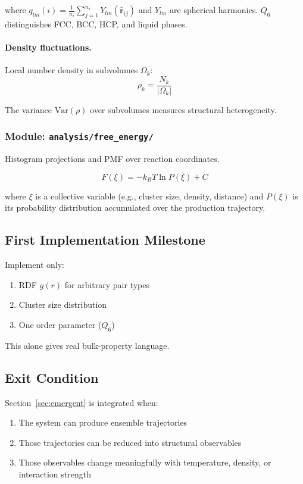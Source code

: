 \documentclass[11pt]{article}
\begin{document}
where $q_{lm}(i) = \frac{1}{n_i} \sum_{j=1}^{n_i} Y_{lm}(\hat{\mathbf{r}}_{ij})$
and $Y_{lm}$ are spherical harmonics.  $Q_6$ distinguishes FCC, BCC, HCP,
and liquid phases.

\paragraph{Density fluctuations.}
Local number density in subvolumes $\Omega_k$:
\begin{equation}
  \rho_k = \frac{N_k}{|\Omega_k|}
\end{equation}

The variance $\text{Var}(\rho)$ over subvolumes measures structural
heterogeneity.

\subsubsection{Module: \texttt{analysis/free\_energy/}}

Histogram projections and PMF over reaction coordinates.

\begin{equation}
  F(\xi) = -k_B T \ln P(\xi) + C
  \label{eq:free_energy_1d}
\end{equation}

where $\xi$ is a collective variable (e.g., cluster size, density, distance)
and $P(\xi)$ is its probability distribution accumulated over the production
trajectory.

\subsection{First Implementation Milestone}

Implement only:
\begin{enumerate}
  \item RDF $g(r)$ for arbitrary pair types
  \item Cluster size distribution
  \item One order parameter ($Q_6$)
\end{enumerate}

This alone gives real bulk-property language.

\subsection{Exit Condition}

Section~\ref{sec:emergent} is integrated when:
\begin{enumerate}
  \item The system can produce ensemble trajectories
  \item Those trajectories can be reduced into structural observables
  \item Those observables change meaningfully with temperature, density,
        or interaction strength
\end{enumerate}
\end{document}
